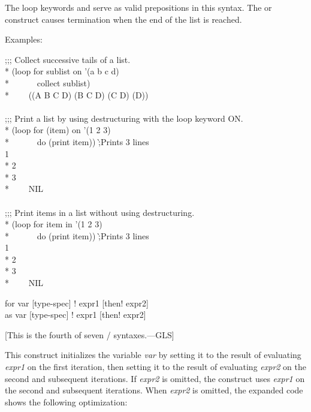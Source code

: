\begin{new}
\begin{defloop}
The loop keywords  and  serve as valid
prepositions in this syntax.
The  or  construct causes termination when the
end of the list is reached.

Examples:
\begin{lisp}
;;; Collect successive tails of a list. \\*
(loop for sublist on '(a b c d) \\*
~~~~~~collect sublist) \\*
~~~\EV~((A B C D) (B C D) (C D) (D)) \\
 \\
;;; Print a list by using destructuring with the loop keyword ON. \\*
(loop for (item) on '(1 2 3) \\*
~~~~~~do (print item))  \`;{\rm Prints 3 lines}\\
1  \\*
2  \\*
3  \\*
~~~\EV~NIL \\
 \\
;;; Print items in a list without using destructuring. \\*
(loop for item in '(1 2 3) \\*
~~~~~~do (print item))  \`;{\rm Prints 3 lines}\\
1  \\*
2  \\*
3  \\*
~~~\EV~NIL
\end{lisp}
\end{defloop}

\begin{defloop}
for var [type-spec] \!\Xequal! expr1 [\!then! expr2] \\
as var [type-spec] \!\Xequal! expr1 [\!then! expr2]

[This is the fourth of seven / syntaxes.---GLS]


  This construct initializes the variable {\it var\/} by setting it to the
  result of evaluating {\it expr1\/} on the first iteration, then setting
  it to the result of evaluating {\it expr2\/} on the second and
  subsequent iterations.  If {\it expr2\/} is omitted, the construct
  uses {\it expr1\/} on the second and
  subsequent iterations.  When {\it expr2\/} is omitted, the expanded
  code shows the following optimization:


\end{defloop}
\end{new}
